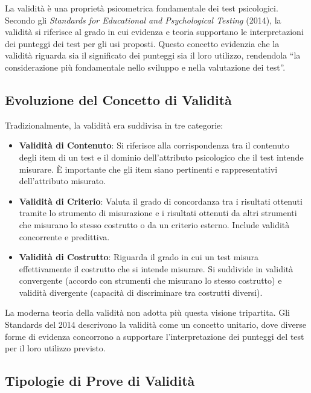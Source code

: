\documentclass[
  letterpaper,
  krantz2]{{[}./krantz{]}}
\providecommand{\tightlist}{%
  \setlength{\itemsep}{0pt}\setlength{\parskip}{0pt}}\usepackage{longtable,booktabs,array}
\begin{document}
La validità è una proprietà psicometrica fondamentale dei test
psicologici. Secondo gli \emph{Standards for Educational and
Psychological Testing} (2014), la validità si riferisce al grado in cui
evidenza e teoria supportano le interpretazioni dei punteggi dei test
per gli usi proposti. Questo concetto evidenzia che la validità riguarda
sia il significato dei punteggi sia il loro utilizzo, rendendola ``la
considerazione più fondamentale nello sviluppo e nella valutazione dei
test''.

\subsection{Evoluzione del Concetto di
Validità}\label{evoluzione-del-concetto-di-validituxe0}

Tradizionalmente, la validità era suddivisa in tre categorie:

\begin{itemize}
\tightlist
\item
  \textbf{Validità di Contenuto}: Si riferisce alla corrispondenza tra
  il contenuto degli item di un test e il dominio dell'attributo
  psicologico che il test intende misurare. È importante che gli item
  siano pertinenti e rappresentativi dell'attributo misurato.
\item
  \textbf{Validità di Criterio}: Valuta il grado di concordanza tra i
  risultati ottenuti tramite lo strumento di misurazione e i risultati
  ottenuti da altri strumenti che misurano lo stesso costrutto o da un
  criterio esterno. Include validità concorrente e predittiva.
\item
  \textbf{Validità di Costrutto}: Riguarda il grado in cui un test
  misura effettivamente il costrutto che si intende misurare. Si
  suddivide in validità convergente (accordo con strumenti che misurano
  lo stesso costrutto) e validità divergente (capacità di discriminare
  tra costrutti diversi).
\end{itemize}

La moderna teoria della validità non adotta più questa visione
tripartita. Gli Standards del 2014 descrivono la validità come un
concetto unitario, dove diverse forme di evidenza concorrono a
supportare l'interpretazione dei punteggi del test per il loro utilizzo
previsto.

\subsection{Tipologie di Prove di
Validità}\label{tipologie-di-prove-di-validituxe0}
\end{document}
